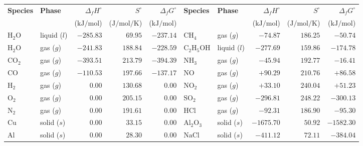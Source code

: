 \begin{table}[!htbp]
\centering
{}\label{tab:08:thermochem}
\footnotesize\setlength{\tabcolsep}{3.8pt}\renewcommand{\arraystretch}{1.08}
\begin{tabularx}{\linewidth}{@{}l l r r r | l l r r r@{}}
\toprule
\textbf{Species} & \textbf{Phase} & $\Delta_f H^\circ$ & $S^\circ$ & $\Delta_f G^\circ$ & \textbf{Species} & \textbf{Phase} & $\Delta_f H^\circ$ & $S^\circ$ & $\Delta_f G^\circ$ \\
 & & ($\si{\kilo\joule\per\mole}$) & ($\si{\joule\per\mole\per\kelvin}$) & ($\si{\kilo\joule\per\mole}$) & & & ($\si{\kilo\joule\per\mole}$) & ($\si{\joule\per\mole\per\kelvin}$) & ($\si{\kilo\joule\per\mole}$) \\
\midrule
$\mathrm{H_2O}$ & liquid ($l$) & $-285.83$ & $69.95$ & $-237.14$ & $\mathrm{CH_4}$ & gas ($g$) & $-74.87$ & $186.25$ & $-50.74$ \\
$\mathrm{H_2O}$ & gas ($g$) & $-241.83$ & $188.84$ & $-228.59$ & $\mathrm{C_2H_5OH}$ & liquid ($l$) & $-277.69$ & $159.86$ & $-174.78$ \\
$\mathrm{CO_2}$ & gas ($g$) & $-393.51$ & $213.79$ & $-394.39$ & $\mathrm{NH_3}$ & gas ($g$) & $-45.94$ & $192.77$ & $-16.41$ \\
$\mathrm{CO}$ & gas ($g$) & $-110.53$ & $197.66$ & $-137.17$ & $\mathrm{NO}$ & gas ($g$) & $+90.29$ & $210.76$ & $+86.58$ \\
$\mathrm{H_2}$ & gas ($g$) & $0.00$ & $130.68$ & $0.00$ & $\mathrm{NO_2}$ & gas ($g$) & $+33.10$ & $240.04$ & $+51.23$ \\
$\mathrm{O_2}$ & gas ($g$) & $0.00$ & $205.15$ & $0.00$ & $\mathrm{SO_2}$ & gas ($g$) & $-296.81$ & $248.22$ & $-300.13$ \\
$\mathrm{N_2}$ & gas ($g$) & $0.00$ & $191.61$ & $0.00$ & $\mathrm{HCl}$ & gas ($g$) & $-92.31$ & $186.90$ & $-95.30$ \\
$\mathrm{Cu}$ & solid ($s$) & $0.00$ & $33.15$ & $0.00$ & $\mathrm{Al_2O_3}$ & solid ($s$) & $-1675.70$ & $50.92$ & $-1582.30$ \\
$\mathrm{Al}$ & solid ($s$) & $0.00$ & $28.30$ & $0.00$ & $\mathrm{NaCl}$ & solid ($s$) & $-411.12$ & $72.11$ & $-384.04$ \\
\bottomrule
\end{tabularx}
\end{table}

